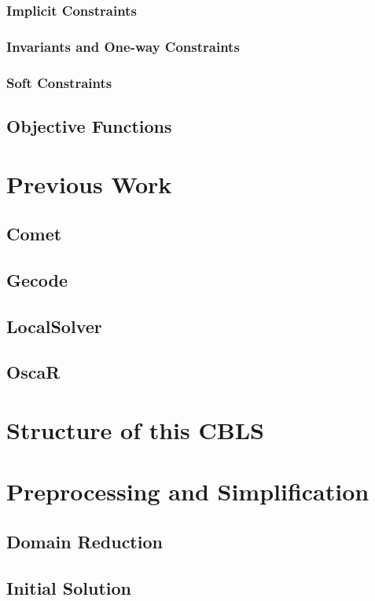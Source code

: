 \documentclass[a4paper,12pt]{article}
\begin{document}
    \subsubsection{Implicit Constraints}
    
    \subsubsection{Invariants and One-way Constraints}
    
    \subsubsection{Soft Constraints}
    
  \subsection{Objective Functions}
  

\section{Previous Work}
  \subsection{Comet}
  
  \subsection{Gecode}
  \subsection{LocalSolver}
  \subsection{OscaR}
\section{Structure of this CBLS }
  
\section{Preprocessing and Simplification}
  \subsection{Domain Reduction}
  \subsection{Initial Solution}
\end{document}
